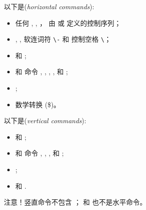 \documentclass{book}
\begin{document}
以下是(\emph{horizontal commands}):
\label{h:com:list}
\begin{itemize}
\item 任何 , , ，
由  或  定义的控制序列；
\item {}, , 
软连词符 \verb|\-| 和 控制空格 \verb|\|；
\item {} 和 ;
\item {} 和  命令
, , , , 和 ;
\item {};
\item 数学转换 (\n\$)。
\end{itemize}

以下是(\emph{vertical commands}):
\label{v:com:list}
\begin{itemize}
\item {} 和 ;
\item {} 和  命令
 , , ,  和 ;
\item {};
\item {} 和 .
\end{itemize}
注意！竖直命令不包含 ；
 和  也不是水平命令。
\end{document}
